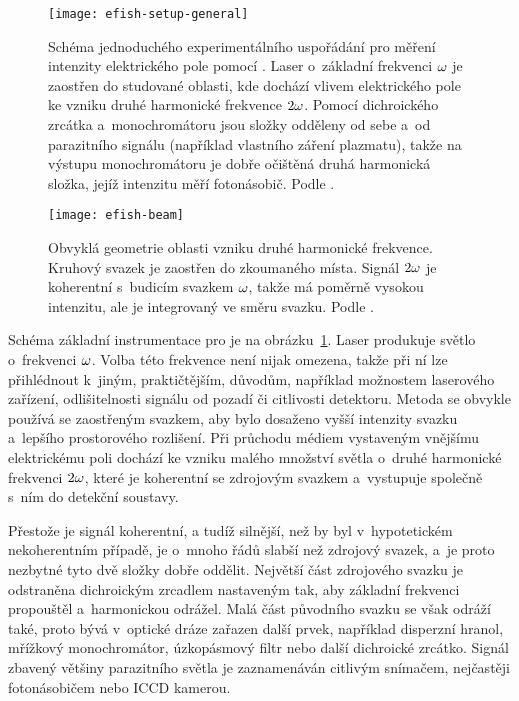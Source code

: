 \begin{figure}[p]
	\centering
	\texttt{[image: efish-setup-general]}
	\caption{Schéma jednoduchého experimentálního uspořádání pro měření
		intenzity elektrického pole pomocí \EFISH{}.
		Laser o~základní frekvenci $\omega$ je zaostřen do studované
		oblasti, kde dochází vlivem elektrického pole ke vzniku
		druhé harmonické frekvence $2\omega$.
		Pomocí dichroického zrcátka a~monochromátoru jsou složky
		odděleny od sebe a~od parazitního signálu
		(například vlastního záření plazmatu),
		takže na výstupu monochromátoru je dobře očištěná druhá harmonická
		složka, jejíž intenzitu měří fotonásobič.
		Podle \cite{efish-2018}.}
	\label{fig:efish-setup-general}
\end{figure}

\begin{figure}[p]
	\centering
	\texttt{[image: efish-beam]}
	\caption{Obvyklá geometrie oblasti vzniku druhé harmonické frekvence.
		Kruhový svazek je zaostřen do zkoumaného místa.
		Signál $2\omega$ je koherentní s~budicím svazkem $\omega$,
		takže má poměrně vysokou intenzitu,
		ale je integrovaný ve směru svazku.
		Podle \cite{efish-focusing, efish-lecture}.}
	\label{fig:efish-beam}
\end{figure}

Schéma základní instrumentace pro \EFISH{} je
na obrázku~\ref{fig:efish-setup-general}.
Laser produkuje světlo o~frekvenci $\omega$.
Volba této frekvence není nijak omezena, takže při ní lze přihlédnout
k~jiným, praktičtějším, důvodům, například možnostem laserového zařízení,
odlišitelnosti signálu od pozadí či citlivosti detektoru.
Metoda se obvykle používá se zaostřeným svazkem,
aby bylo dosaženo vyšší intenzity svazku a~lepšího prostorového rozlišení.
Při průchodu médiem vystaveným vnějšímu elektrickému poli dochází
ke vzniku malého množství světla o~druhé harmonické frekvenci $2\omega$,
které je koherentní se zdrojovým svazkem a~vystupuje společně s~ním
do detekční soustavy.

Přestože je signál koherentní, a tudíž silnější,
než by byl v~hypotetickém nekoherentním případě,
je o~mnoho řádů slabší než zdrojový svazek, a~je proto nezbytné
tyto dvě složky dobře oddělit.
Největší část zdrojového svazku je odstraněna dichroickým zrcadlem
nastaveným tak, aby základní frekvenci propouštěl a~harmonickou odrážel.
Malá část původního svazku se však odráží také, proto bývá v~optické dráze
zařazen další prvek, například disperzní hranol, mřížkový monochromátor,
úzkopásmový filtr nebo další dichroické zrcátko.
Signál zbavený většiny parazitního světla je zaznamenáván citlivým snímačem,
nejčastěji fotonásobičem nebo ICCD kamerou.

